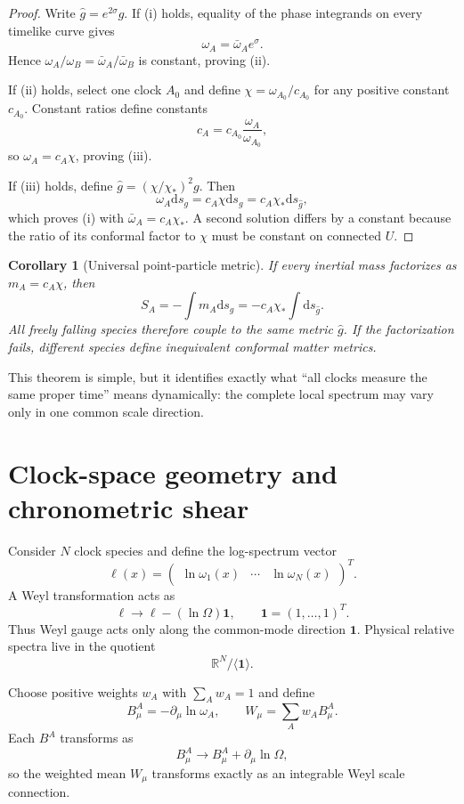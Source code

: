 \documentclass[11pt,a4paper]{article}
\newtheorem{corollary}[definition]{Corollary}
\newcommand{\dd}{\mathrm{d}}
\begin{document}
\begin{proof}
Write $\widehat g=e^{2\sigma}g$. If (i) holds, equality of the phase integrands on every timelike curve gives
\[
 \omega_A=\bar\omega_Ae^\sigma.
\]
Hence $\omega_A/\omega_B=\bar\omega_A/\bar\omega_B$ is constant, proving (ii).

If (ii) holds, select one clock $A_0$ and define $\chi=\omega_{A_0}/c_{A_0}$ for any positive constant $c_{A_0}$. Constant ratios define constants
\[
 c_A=c_{A_0}\frac{\omega_A}{\omega_{A_0}},
\]
so $\omega_A=c_A\chi$, proving (iii).

If (iii) holds, define $\widehat g=(\chi/\chi_*)^2g$. Then
\[
 \omega_A\dd s_g=c_A\chi\dd s_g=c_A\chi_*\dd s_{\widehat g},
\]
which proves (i) with $\bar\omega_A=c_A\chi_*$. A second solution differs by a constant because the ratio of its conformal factor to $\chi$ must be constant on connected $U$.
\end{proof}

\begin{corollary}[Universal point-particle metric]
If every inertial mass factorizes as $m_A=c_A\chi$, then
\[
 S_A=-\int m_A\dd s_g=-c_A\chi_*\int\dd s_{\widehat g}.
\]
All freely falling species therefore couple to the same metric $\widehat g$. If the factorization fails, different species define inequivalent conformal matter metrics.
\end{corollary}

This theorem is simple, but it identifies exactly what ``all clocks measure the same proper time'' means dynamically: the complete local spectrum may vary only in one common scale direction.

\section{Clock-space geometry and chronometric shear}

Consider $N$ clock species and define the log-spectrum vector
\[
 \bm\ell(x)=\begin{pmatrix}\ln\omega_1(x)&\cdots&\ln\omega_N(x)\end{pmatrix}^{\!T}.
\]
A Weyl transformation acts as
\[
 \bm\ell\longrightarrow\bm\ell-(\ln\Omega)\bm 1,
\qquad
 \bm 1=(1,\ldots,1)^T.
\]
Thus Weyl gauge acts only along the common-mode direction $\bm1$. Physical relative spectra live in the quotient
\[
 \mathbb R^N/\langle\bm1\rangle.
\]

Choose positive weights $w_A$ with $\sum_Aw_A=1$ and define
\[
 B^A_\mu=-\partial_\mu\ln\omega_A,
\qquad
 W_\mu=\sum_Aw_AB^A_\mu.
\]
Each $B^A$ transforms as
\[
 B^A_\mu\longrightarrow B^A_\mu+\partial_\mu\ln\Omega,
\]
so the weighted mean $W_\mu$ transforms exactly as an integrable Weyl scale connection.
\end{document}
